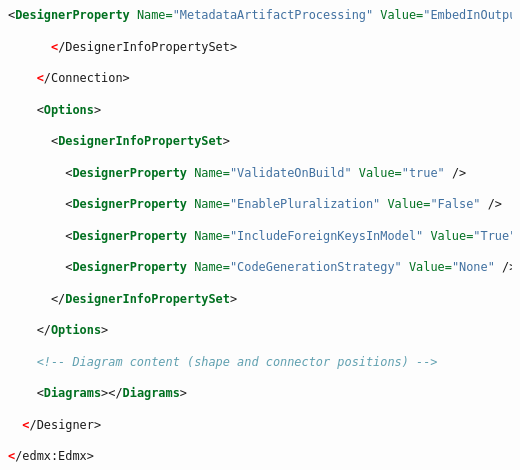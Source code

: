 \documentclass[a4paper,10pt]{scrreprt}
\begin{document}
\begin{lstlisting}[caption=sample edmx file,language=xml]
        <DesignerProperty Name="MetadataArtifactProcessing" Value="EmbedInOutputAssembly" />

      </DesignerInfoPropertySet>

    </Connection>

    <Options>

      <DesignerInfoPropertySet>

        <DesignerProperty Name="ValidateOnBuild" Value="true" />

        <DesignerProperty Name="EnablePluralization" Value="False" />

        <DesignerProperty Name="IncludeForeignKeysInModel" Value="True" />

        <DesignerProperty Name="CodeGenerationStrategy" Value="None" />

      </DesignerInfoPropertySet>

    </Options>

    <!-- Diagram content (shape and connector positions) -->

    <Diagrams></Diagrams>

  </Designer>

</edmx:Edmx>
\end{lstlisting}
\end{document}
